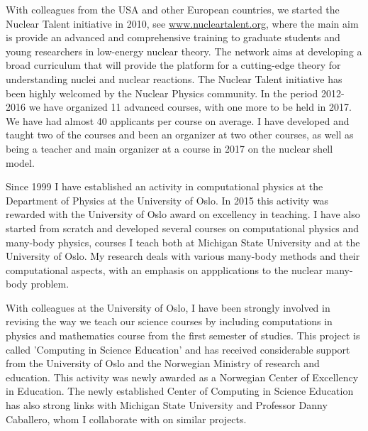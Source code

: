 \begin{numberedlist}
\item With colleagues from the USA and other European countries, we started the Nuclear Talent initiative in 2010,
see \url{www.nucleartalent.org}, where the main aim is  provide an advanced
and comprehensive training to graduate students and young researchers
in low-energy nuclear theory. The network aims at developing a broad
curriculum that will provide the platform for a cutting-edge theory
for understanding nuclei and nuclear reactions.  The Nuclear Talent initiative has been highly welcomed by the Nuclear Physics community.
In the period 2012-2016 we have organized 11 advanced courses, with one more to be held in 2017. We have had almost 40 applicants per course on average. I have developed and taught two of the courses and been an organizer at two other courses, as well as being a teacher and main organizer at a course in 2017 on the nuclear shell model.

\item Since 1999
I have   established an activity in computational physics  at the 
Department of Physics at the University
of Oslo. In 2015 this activity was rewarded with the University of Oslo award on excellency in teaching. I have also started from scratch and developed several  courses on computational physics and many-body physics, courses I teach both at Michigan State University and at the University of Oslo. My research deals with various many-body methods and their computational aspects, with an emphasis on appplications to the nuclear many-body problem.


\item With colleagues at the University of Oslo, I have  
been strongly involved in revising the way we teach our  science courses by including computations in physics and mathematics course from the first semester of studies.
This project is called 'Computing in Science Education' 
and has received considerable support
from the University of Oslo and the Norwegian Ministry of research and education.   This activity was newly awarded as a Norwegian Center of Excellency in Education. The newly established Center of Computing in Science Education has also strong links with Michigan State University and Professor Danny Caballero, whom I collaborate with on similar projects. 


\end{numberedlist}

